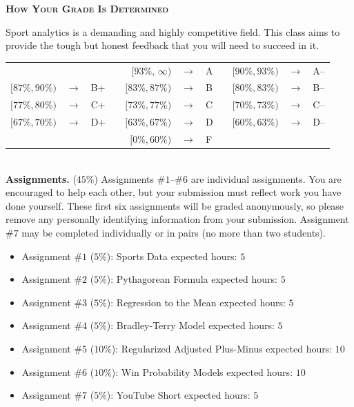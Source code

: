\documentclass[11pt]{article}
\begin{document}
\newpage
\textbf{\textsc{How Your Grade Is Determined}}
\begin{adjustwidth}{1cm}{0cm}
	Sport analytics is a demanding and highly competitive field. This class aims to provide the tough but honest feedback that you will need to succeed in it.
  \begin{center}
    \begin{tabular}{rclcrclcrcl}
                      &               &     & & $[93\%,\,\infty)$ & $\rightarrow$ & A & & $[90\%, 93\%)$ & $\rightarrow$	& A--\\
      $[87\%, 90\%)$  & $\rightarrow$	& B+  & & $[83\%, 87\%)$  & $\rightarrow$ & B & & $[80\%, 83\%)$ & $\rightarrow$	& B--\\
      $[77\%, 80\%)$  & $\rightarrow$	& C+  & & $[73\%, 77\%)$  & $\rightarrow$ & C & & $[70\%, 73\%)$ & $\rightarrow$	& C--\\
      $[67\%, 70\%)$  & $\rightarrow$	& D+  & & $[63\%, 67\%)$  & $\rightarrow$ & D & & $[60\%, 63\%)$ & $\rightarrow$  & D--\\
                      &               &     & & $[ 0\%, 60\%)$  & $\rightarrow$ & F\\
    \end{tabular}
  \end{center}
  ~\\
	\textbf{Assignments.} ($45\%$) Assignments \#$1$--\#$6$ are individual assignments. You are encouraged to help each other, but your submission must reflect work you have done yourself. These first six assignments will be graded anonymously, so please remove any personally identifying information from your submission. Assignment \#$7$ may be completed individually or in pairs (no more than two students).
  \begin{itemize}
    \item Assignment \#$1$ ($5\%$): Sports Data                       \hfill  expected hours: $5$
    \item Assignment \#$2$ ($5\%$): Pythagorean Formula               \hfill  expected hours: $5$
    \item Assignment \#$3$ ($5\%$): Regression to the Mean            \hfill  expected hours: $5$
    \item Assignment \#$4$ ($5\%$): Bradley-Terry Model               \hfill  expected hours: $5$
    \item Assignment \#$5$ ($10\%$): Regularized Adjusted Plus-Minus  \hfill  expected hours: $10$
    \item Assignment \#$6$ ($10\%$): Win Probability Models           \hfill  expected hours: $10$
    \item Assignment \#$7$ ($5\%$): YouTube Short                     \hfill  expected hours: $5$
  \end{itemize}


\end{adjustwidth}
\end{document}
